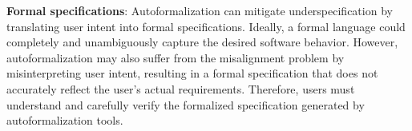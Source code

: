 


\textbf{Formal specifications}: Autoformalization can mitigate underspecification by translating user intent into formal specifications. Ideally, a formal language could completely and unambiguously capture the desired software behavior. However, autoformalization may also suffer from the misalignment problem by misinterpreting user intent, resulting in a formal specification that does not accurately reflect the user's actual requirements. Therefore, users must understand and carefully verify the formalized specification generated by autoformalization tools. 


